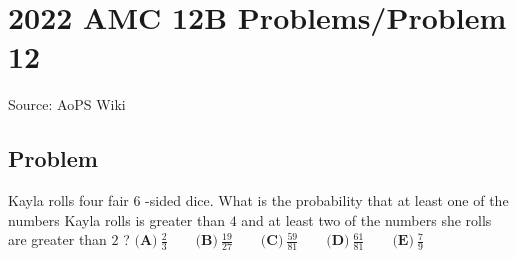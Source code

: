 \documentclass[12pt]{article}
\begin{document}
\section*{{2022 AMC 12B Problems/Problem 12}}
Source: AoPS Wiki

\subsection*{Problem}
Kayla rolls four fair $6$ -sided dice. What is the probability that at least one of the numbers Kayla rolls is greater than $4$ and at least two of the numbers she rolls are greater than $2$ ? $\textbf{(A)}\ \frac{2}{3} \qquad \textbf{(B)}\ \frac{19}{27} \qquad \textbf{(C)}\ \frac{59}{81} \qquad \textbf{(D)}\ \frac{61}{81} \qquad \textbf{(E)}\ \frac{7}{9}$
\end{document}
